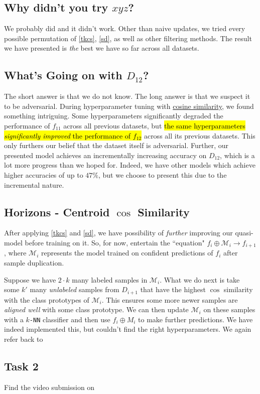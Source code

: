 \documentclass{article} %
\begin{document}
\subsection{Why didn't you try $xyz$?}
We probably did and it didn't work. Other than naive updates, we tried every possible permutation of \ref{tkcs}, \ref{sd}, as well as other filtering methods. The result we have presented is \textit{the} best we have so far across all datasets.

\subsection{What's Going on with $D_{12}$?}
The short answer is that we do not know. The long answer is that we suspect it to be adversarial. During hyperparameter tuning with \hyperref[cossim]{cosine similarity}, we found something intriguing. Some hyperparameters significantly degraded the performance of $f_{11}$ across all previous datasets, but \hl{the same hyperparameters \textit{significantly improved} the performance of $f_{12}$} across all its previous datasets. This only furthers our belief that the dataset itself is adversarial. Further, our presented model achieves an incrementally increasing accuracy on $D_{12}$, which is a lot more progress than we hoped for. Indeed, we have other models which achieve higher accuracies of up to $47 \%$, but we choose to present this due to the incremental nature.

\subsection{Horizons - Centroid $\cos$ Similarity}\label{cossim}
After applying \ref{tkcs} and \ref{sd}, we have possibility of \textit{further} improving our quasi-model before training on it. So, for now, entertain the ``equation" $f_i \oplus \mathcal M_i \rightarrow f_{i + 1}$, where $\mathcal M_i$ represents the model trained on confident predictions of $f_i$ after sample duplication.

Suppose we have $2\cdot k$ many labeled samples in $\mathcal M_i$. What we do next is take some $k'$ many \textit{unlabeled} samples from $D_{i + 1}$ that have the highest $\cos$ similarity with the class prototypes of $\mathcal M_i$. This ensures some more newer samples are \textit{aligned well} with some class prototype. We can then update $\mathcal M_i$ on these samples with a $k$\texttt{-NN} classifier and then use $f_i \oplus M_i$ to make further predictions. We have indeed implemented this, but couldn't find the right hyperparameters. We again refer back to \cite{liu2023dejavu}

\subsection{Task 2}
Find the video submission on \cite{video}



\end{document}
